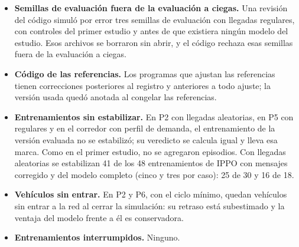 \begin{itemize}
  \item \textbf{Semillas de evaluación fuera de la evaluación a
    ciegas.} Una revisión del código simuló por error tres semillas de
    evaluación con llegadas regulares, con controles del primer estudio
    y antes de que existiera ningún modelo del estudio. Esos archivos se
    borraron sin abrir, y el código rechaza esas semillas fuera de la
    evaluación a ciegas.
  \item \textbf{Código de las referencias.} Los programas que ajustan
    las referencias tienen correcciones posteriores al registro y
    anteriores a todo ajuste; la versión usada quedó anotada al
    congelar las referencias.
  \item \textbf{Entrenamientos sin estabilizar.} En P2 con llegadas
    aleatorias, en P5 con regulares y en el corredor con perfil de
    demanda, el entrenamiento de la versión evaluada no se estabilizó;
    su veredicto se calcula igual y lleva esa marca. Como en el primer
    estudio, no se agregaron episodios. Con llegadas aleatorias se
    estabilizan 41 de los 48 entrenamientos de IPPO con mensajes
    corregido y del modelo completo (cinco y tres por caso): 25 de 30 y
    16 de 18.
  \item \textbf{Vehículos sin entrar.} En P2 y P6, con el ciclo mínimo,
    quedan vehículos sin entrar a la red al cerrar la simulación: su
    retraso está subestimado y la ventaja del modelo frente a él es
    conservadora.
  \item \textbf{Entrenamientos interrumpidos.} Ninguno.
\end{itemize}
